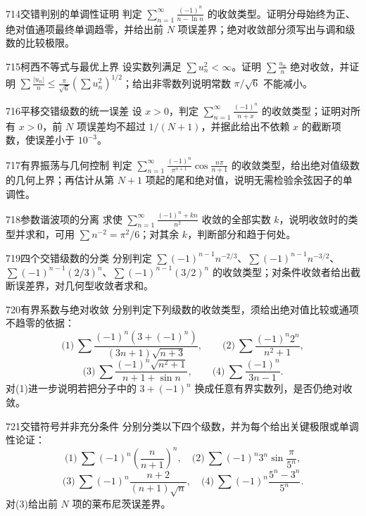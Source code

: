 \begin{exercise}{714}{交错判别的单调性证明}
判定 $\sum_{n=1}^{\infty}\frac{(-1)^n}{n-\ln n}$ 的收敛类型。证明分母始终为正、绝对值通项最终单调趋零，并给出前 $N$ 项误差界；绝对收敛部分须写出与调和级数的比较极限。
\end{exercise}
\begin{exercise}{715}{柯西不等式与最优上界}
设实数列满足 $\sum u_n^2<\infty$。证明 $\sum\frac{u_n}{n}$ 绝对收敛，并证明 $\sum\frac{|u_n|}{n}\le\frac\pi{\sqrt6}(\sum u_n^2)^{1/2}$；给出非零数列说明常数 $\pi/\sqrt6$ 不能减小。
\end{exercise}
\begin{exercise}{716}{平移交错级数的统一误差}
设 $x>0$，判定 $\sum_{n=1}^{\infty}\frac{(-1)^n}{n+x}$ 的收敛类型；证明对所有 $x>0$，前 $N$ 项误差均不超过 $1/(N+1)$，并据此给出不依赖 $x$ 的截断项数，使误差小于 $10^{-3}$。
\end{exercise}
\begin{exercise}{717}{有界振荡与几何控制}
判定 $\sum_{n=1}^{\infty}\frac{(-1)^n}{\pi^{n+1}}\cos\frac{n\pi}{n+1}$ 的收敛类型，给出绝对值级数的几何上界；再估计从第 $N+1$ 项起的尾和绝对值，说明无需检验余弦因子的单调性。
\end{exercise}
\begin{exercise}{718}{参数谐波项的分离}
求使 $\sum_{n=1}^{\infty}\frac{(-1)^n+kn}{n^2}$ 收敛的全部实数 $k$，说明收敛时的类型并求和，可用 $\sum n^{-2}=\pi^2/6$；对其余 $k$，判断部分和趋于何处。
\end{exercise}
\begin{exercise}{719}{四个交错级数的分类}
分别判定 $\sum(-1)^{n-1}n^{-2/3}$、$\sum(-1)^{n-1}n^{-3/2}$、$\sum(-1)^{n-1}(2/3)^n$、$\sum(-1)^{n-1}(3/2)^n$ 的收敛类型；对条件收敛者给出截断误差界，对几何型收敛者求和。
\end{exercise}
\begin{exercise}{720}{有界系数与绝对收敛}
分别判定下列级数的收敛类型，须给出绝对值比较或通项不趋零的依据：
\[\text{(1)}\ \sum\frac{(-1)^n(3+(-1)^n)}{(3n+1)\sqrt{n+3}},\qquad
\text{(2)}\ \sum\frac{(-1)^n2^n}{n^2+1},\]
\[\text{(3)}\ \sum\frac{(-1)^n\sqrt{n^2+1}}{n+1+\sin n},\qquad
\text{(4)}\ \sum\frac{(-1)^n}{3n-1}.\]
对(1)进一步说明若把分子中的 $3+(-1)^n$ 换成任意有界实数列，是否仍绝对收敛。
\end{exercise}
\begin{exercise}{721}{交错符号并非充分条件}
分别分类以下四个级数，并为每个给出关键极限或单调性论证：
\[\text{(1)}\ \sum(-1)^n\left(\frac n{n+1}\right)^n,\quad
\text{(2)}\ \sum(-1)^n3^n\sin\frac\pi{5^n},\]
\[\text{(3)}\ \sum(-1)^n\frac{n+2}{(n+1)\sqrt n},\quad
\text{(4)}\ \sum(-1)^n\frac{5^n-3^n}{5^n}.\]
对(3)给出前 $N$ 项的莱布尼茨误差界。
\end{exercise}
